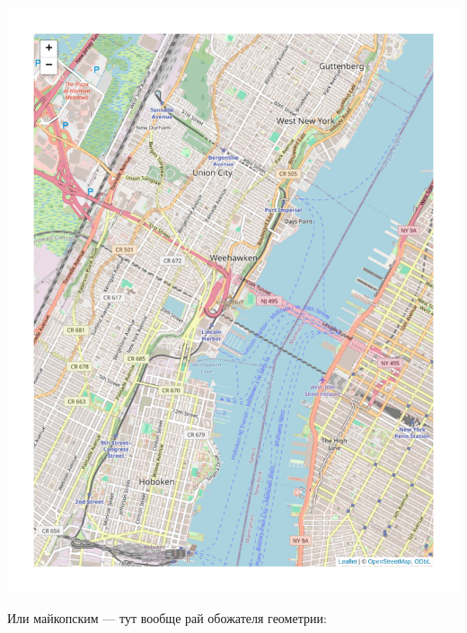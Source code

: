 \documentclass[
  letterpaper,
]{scrbook}
\theoremstyle{definition}
\theoremstyle{remark}
\begin{document}
\includegraphics{andan-cluster_files/figure-pdf/manhattan-1.pdf}

Или майкопским --- тут вообще рай обожателя геометрии:
\end{document}

